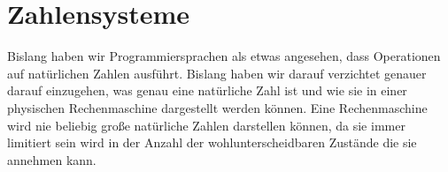 \documentclass[11pt,a4paper,leqno]{report}
\newtheorem{definition}[theorem]{Definition}
\numberwithin{equation}{chapter}
\begin{document}
\chapter{Zahlensysteme}
Bislang haben wir Programmiersprachen als etwas angesehen, dass Operationen auf natürlichen Zahlen ausführt. Bislang haben wir darauf verzichtet genauer darauf einzugehen, was genau eine natürliche Zahl ist und wie sie in einer physischen Rechenmaschine dargestellt werden können.
Eine Rechenmaschine wird nie beliebig große natürliche Zahlen darstellen können, da sie immer limitiert sein wird in der Anzahl der wohlunterscheidbaren Zustände die sie annehmen kann.%
\end{document}
